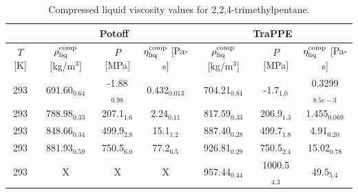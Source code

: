 \documentclass[preprint,review,12pt]{elsarticle}
\begin{document}
	\begin{table}[H]
		\caption{Compressed liquid viscosity values for 2,2,4-trimethylpentane.}
		\begin{center}
			\begin{tabular}{|c|c|c|c|c|c|c|}
				\hline
				& \multicolumn{3}{c|}{Potoff}                                                                         & \multicolumn{3}{c|}{TraPPE}                                                                          \\ \hline
				$T$ {[}K{]} & $\rho^{\rm comp}_{\rm liq}$ {[}kg/m$^3${]} & $P$ {[}MPa{]}  & $\eta^{\rm comp}_{\rm liq}$ {[}Pa-s{]} & $\rho^{\rm comp}_{\rm liq}$ {[}kg/m$^3${]} & $P$ {[}MPa{]}  & $\eta^{\rm comp}_{\rm liq}$ {[}Pa-s{]} \\ \hline
				293         & 691.60$_{0.64}$                            & -1.88$_{0.98}$ & 0.432$_{0.013}$                        & 704.21$_{0.84}$                         & -1.7$_{1.0}$   & 0.3299$_{8.5e-3}$                      \\ \hline
				293         & 788.98$_{0.33}$                            & 207.1$_{1.6}$  & 2.24$_{0.11}$                          & 817.59$_{0.33}$                         & 206.9$_{1.3}$  & 1.455$_{0.069}$                        \\ \hline
				293         & 848.66$_{0.34}$                            & 499.9$_{2.8}$  & 15.1$_{1.2}$                           & 887.40$_{0.28}$                         & 499.7$_{1.8}$  & 4.91$_{0.20}$                          \\ \hline
				293         & 881.93$_{0.59}$                            & 750.5$_{6.0}$  & 77.2$_{6.5}$                           & 926.81$_{0.29}$                         & 750.5$_{2.4}$  & 15.02$_{0.78}$                         \\ \hline
				293         & X                                          & X              & X                                      & 957.44$_{0.44}$                         & 1000.5$_{4.3}$ & 49.5$_{5.4}$                           \\ \hline
			\end{tabular}
		\end{center}
	\end{table}
\end{document}
